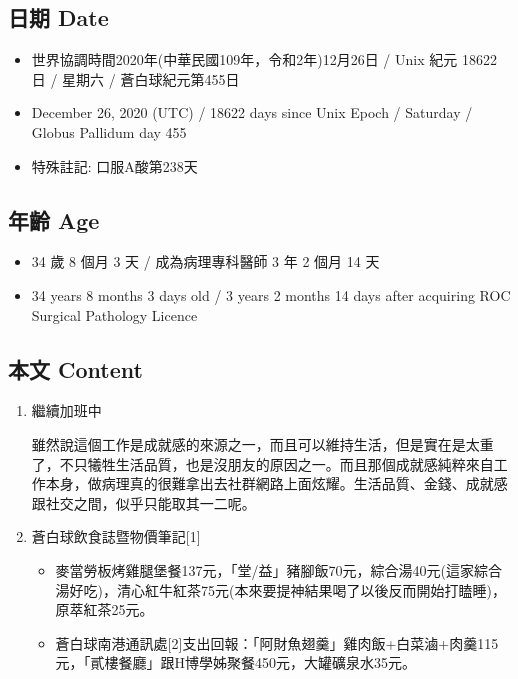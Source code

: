 \documentclass[
]{article}
\providecommand{\tightlist}{%
  \setlength{\itemsep}{0pt}\setlength{\parskip}{0pt}}
\begin{document}
\hypertarget{ux65e5ux671f-date-25}{%
\subsection{日期 Date}\label{ux65e5ux671f-date-25}}

\begin{itemize}
\tightlist
\item
  世界協調時間2020年(中華民國109年，令和2年)12月26日 / Unix 紀元 18622
  日 / 星期六 / 蒼白球紀元第455日
\item
  December 26, 2020 (UTC) / 18622 days since Unix Epoch / Saturday /
  Globus Pallidum day 455
\item
  特殊註記: 口服A酸第238天
\end{itemize}

\hypertarget{ux5e74ux9f61-age-25}{%
\subsection{年齡 Age}\label{ux5e74ux9f61-age-25}}

\begin{itemize}
\tightlist
\item
  34 歲 8 個月 3 天 / 成為病理專科醫師 3 年 2 個月 14 天
\item
  34 years 8 months 3 days old / 3 years 2 months 14 days after
  acquiring ROC Surgical Pathology Licence
\end{itemize}

\hypertarget{ux672cux6587-content-25}{%
\subsection{本文 Content}\label{ux672cux6587-content-25}}

\begin{enumerate}
\def\labelenumi{\arabic{enumi}.}
\item
  繼續加班中

  雖然說這個工作是成就感的來源之一，而且可以維持生活，但是實在是太重了，不只犧牲生活品質，也是沒朋友的原因之一。而且那個成就感純粹來自工作本身，做病理真的很難拿出去社群網路上面炫耀。生活品質、金錢、成就感跟社交之間，似乎只能取其一二呢。
\item
  蒼白球飲食誌暨物價筆記{[}1{]}

  \begin{itemize}
  \tightlist
  \item
    麥當勞板烤雞腿堡餐137元，「堂/益」豬腳飯70元，綜合湯40元(這家綜合湯好吃)，清心紅牛紅茶75元(本來要提神結果喝了以後反而開始打瞌睡)，原萃紅茶25元。
  \item
    蒼白球南港通訊處{[}2{]}支出回報：「阿財魚翅羹」雞肉飯+白菜滷+肉羹115元，「貳樓餐廳」跟H博學姊聚餐450元，大罐礦泉水35元。
  \end{itemize}
\end{enumerate}
\end{document}
